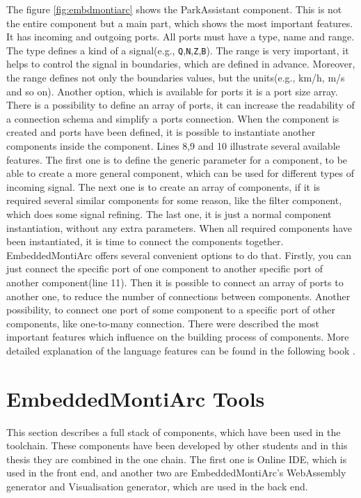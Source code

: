 The figure \ref{fig:embdmontiarc} shows the ParkAssistant component. This is not the entire component but a main part, which shows the most important features. It has incoming and outgoing ports. All ports must have a type, name and range. The type defines a kind of a signal(e.g., \texttt{Q},\texttt{N},\texttt{Z},\texttt{B}). The range is very important, it helps to control the signal in boundaries, which are defined in advance. Moreover, the range defines not only the boundaries values, but the units(e.g., km/h, m/s and so on). Another option, which is available for ports it is a port size array. There is a possibility to define an array of ports, it can increase the readability of a connection schema and simplify a ports connection. When the component is created and ports have been defined, it is possible to instantiate another components inside the component. Lines 8,9 and 10 illustrate several available features. The first one is to define the generic parameter for a component, to be able to create a more general component, which can be used for different types of incoming signal. The next one is to create an array of components, if it is required several similar components for some reason, like the filter component, which does some signal refining. The last one, it is just a normal component instantiation, without any extra parameters. When all required components have been instantiated, it is time to connect the components together. EmbeddedMontiArc offers several convenient options to do that. Firstly, you can just connect the specific port of one component to another specific port of another component(line 11). Then it is possible to connect an array of ports to another one, to reduce the number of connections between components. Another possibility, to connect one port of some component to a specific port of other components, like one-to-many connection. There were described the most important features which influence on the building process of components. More detailed explanation of the language features can be found in the following book \cite{HR17}.

\section{EmbeddedMontiArc Tools} \label{sec:tools}
This section describes a full stack of components, which have been used in the toolchain. These components have been developed by other students and in this thesis they are combined in the one chain. The first one is Online IDE, which is used in the front end, and another two are EmbeddedMontiArc's WebAssembly generator and Visualisation generator, which are used in the back end.

